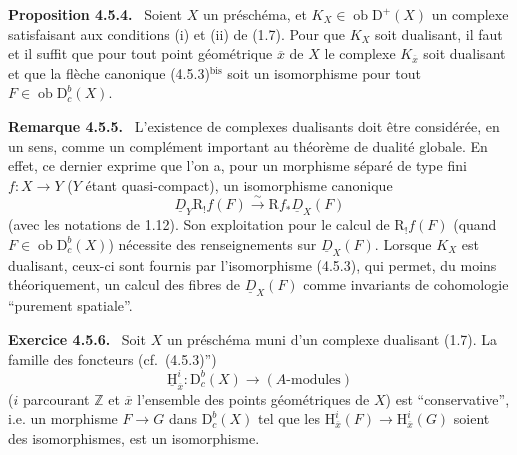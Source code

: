 \documentclass[11pt]{article}
\newenvironment{statement}[1]{\par\medskip\noindent\textbf{#1.}\ }{\par\medskip}
\renewcommand{\H}{\mathrm{H}}
\newcommand{\R}{\mathrm{R}}
\newcommand{\D}{\mathrm{D}}
\newcommand{\Z}{\mathbb{Z}}
\newcommand{\ob}{\operatorname{ob}}
\newcommand{\ol}[1]{\overline{#1}}
\providecommand{\ob}{\operatorname{ob}}
\providecommand{\R}{\mathrm R}
\providecommand{\Z}{\mathbb Z}
\begin{document}
\begin{statement}{Proposition 4.5.4}
Soient $X$ un préschéma, et $K_X\in\ob\D^+(X)$ un complexe satisfaisant aux conditions (i) et (ii) de (1.7). Pour que $K_X$ soit dualisant, il faut et il suffit que pour tout point géométrique $\ol{x}$ de $X$ le complexe $K_{\ol{x}}$ soit dualisant et que la flèche canonique (4.5.3)$^{\mathrm{bis}}$ soit un isomorphisme pour tout $F\in\ob\D_c^b(X)$.
\end{statement}

\begin{statement}{Remarque 4.5.5}
L'existence de complexes dualisants doit être considérée, en un sens, comme un complément important au théorème de dualité globale. En effet, ce dernier exprime que l'on a, pour un morphisme séparé de type fini $f:X\to Y$ ($Y$ étant quasi-compact), un isomorphisme canonique
\[
\underline{D}_Y\R_!f(F)\xrightarrow{\sim}\R f_*\underline{D}_X(F)
\]
(avec les notations de 1.12). Son exploitation pour le calcul de $\R_!f(F)$ (quand $F\in\ob\D_c^b(X)$) nécessite des renseignements sur $\underline{D}_X(F)$. Lorsque $K_X$ est dualisant, ceux-ci sont fournis par l'isomorphisme (4.5.3), qui permet, du moins théoriquement, un calcul des fibres de $\underline{D}_X(F)$ comme invariants de cohomologie ``purement spatiale''.
\end{statement}

\begin{statement}{Exercice 4.5.6}
Soit $X$ un préschéma muni d'un complexe dualisant (1.7). La famille des foncteurs (cf.~(4.5.3)'')
\[
\underline{\H}_{\ol{x}}^i:\D_c^b(X)\longrightarrow (A\text{-modules})
\]
($i$ parcourant $\Z$ et $\ol{x}$ l'ensemble des points géométriques de $X$) est ``conservative'', i.e. un morphisme $F\to G$ dans $\D_c^b(X)$ tel que les $\H_{\ol{x}}^i(F)\to\H_{\ol{x}}^i(G)$ soient des isomorphismes, est un isomorphisme.
\end{statement}
\end{document}
